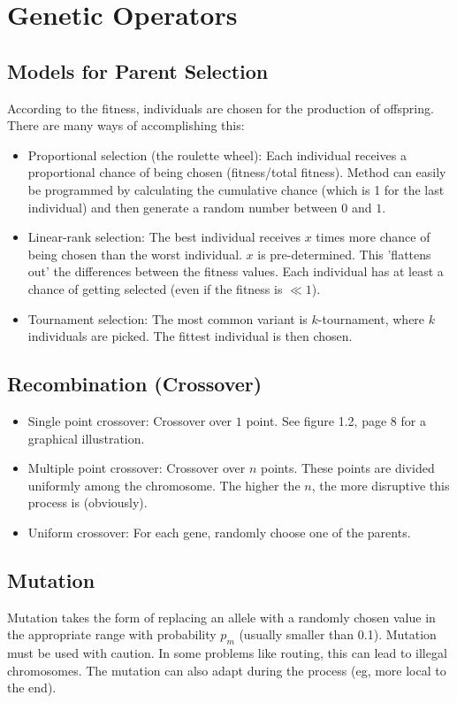 \documentclass[12pt]{book}
\begin{document}
\section{Genetic Operators}
\subsection{Models for Parent Selection}
According to the fitness, individuals are chosen for the production of offspring. There are many ways of accomplishing this:
\begin{itemize}
\item Proportional selection (the roulette wheel): Each individual receives a proportional chance of being chosen (fitness/total fitness). Method can easily be programmed by calculating the cumulative chance (which is 1 for the last individual) and then generate a random number between $0$ and $1$.
\item Linear-rank selection: The best individual receives $x$ times more chance of being chosen than the worst individual. $x$ is pre-determined. This 'flattens out' the differences between the fitness values. Each individual has at least a chance of getting selected (even if the fitness is $\ll1$).
\item Tournament selection: The most common variant is $k$-tournament, where $k$ individuals are picked. The fittest individual is then chosen.
\end{itemize}
\subsection{Recombination (Crossover)}
\begin{itemize}
\item Single point crossover: Crossover over $1$ point. See figure 1.2, page 8 for a graphical illustration.
\item Multiple point crossover: Crossover over $n$ points. These points are divided uniformly among the chromosome. The higher the $n$, the more disruptive this process is (obviously).
\item Uniform crossover: For each gene, randomly choose one of the parents.
\end{itemize}
\subsection{Mutation}
Mutation takes the form of replacing an allele with a randomly chosen value in the appropriate range with probability $p_m$ (usually smaller than 0.1). Mutation must be used with caution. In some problems like routing, this can lead to illegal chromosomes. The mutation can also adapt during the process (eg, more local to the end).
\end{document}
